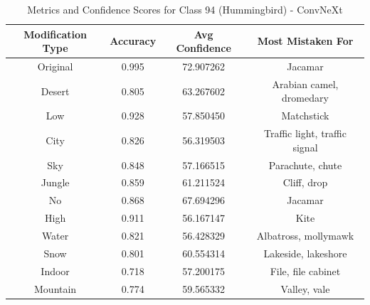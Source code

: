 \begin{table}
	\centering
	\begin{tabular}{|c|c|c|c|}
		\hline
		\textbf{Modification Type} & \textbf{Accuracy} & \textbf{Avg Confidence} & \textbf{Most Mistaken For} \\
		\hline
		Original & 0.995 & 72.907262 & Jacamar \\
		\hline
		Desert & 0.805 & 63.267602 & Arabian camel, dromedary \\
		\hline
		Low & 0.928 & 57.850450 & Matchstick \\
		\hline
		City & 0.826 & 56.319503 & Traffic light, traffic signal \\
		\hline
		Sky & 0.848 & 57.166515 & Parachute, chute \\
		\hline
		Jungle & 0.859 & 61.211524 & Cliff, drop \\
		\hline
		No & 0.868 & 67.694296 & Jacamar \\
		\hline
		High & 0.911 & 56.167147 & Kite \\
		\hline
		Water & 0.821 & 56.428329 & Albatross, mollymawk \\
		\hline
		Snow & 0.801 & 60.554314 & Lakeside, lakeshore \\
		\hline
		Indoor & 0.718 & 57.200175 & File, file cabinet \\
		\hline
		Mountain & 0.774 & 59.565332 & Valley, vale \\
		\hline
	\end{tabular}
	\caption{Metrics and Confidence Scores for Class 94 (Hummingbird) - ConvNeXt}
	\label{tab:metrics_confidence_class_94_convnext}
\end{table}

